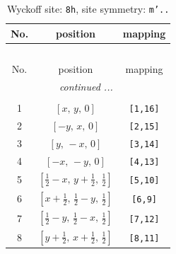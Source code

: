 \documentclass[fleqn,8pt]{jsarticle}
\begin{document}
\begin{longtable}{ccc}
\caption{Wyckoff site: {\tt 8h}, site symmetry: {\tt m'..}}
 \\
 \hline \hline
No. & position & mapping \\ \hline \endfirsthead

\multicolumn{2}{l}{\tablename\ \thetable{}} \\
 \hline \hline
No. & position & mapping \\ \hline \endhead

 \hline \hline
\multicolumn{2}{r}{\footnotesize\it continued ...} \\ \endfoot

 \hline \hline
\multicolumn{2}{r}{} \\ \endlastfoot

1 & $\left[ x,\, y,\, 0 \right]$ & {\tt [1,16]} \\ \hline
2 & $\left[ - y,\, x,\, 0 \right]$ & {\tt [2,15]} \\ \hline
3 & $\left[ y,\, - x,\, 0 \right]$ & {\tt [3,14]} \\ \hline
4 & $\left[ - x,\, - y,\, 0 \right]$ & {\tt [4,13]} \\ \hline
5 & $\left[ \frac{1}{2} - x,\, y + \frac{1}{2},\, \frac{1}{2} \right]$ & {\tt [5,10]} \\ \hline
6 & $\left[ x + \frac{1}{2},\, \frac{1}{2} - y,\, \frac{1}{2} \right]$ & {\tt [6,9]} \\ \hline
7 & $\left[ \frac{1}{2} - y,\, \frac{1}{2} - x,\, \frac{1}{2} \right]$ & {\tt [7,12]} \\ \hline
8 & $\left[ y + \frac{1}{2},\, x + \frac{1}{2},\, \frac{1}{2} \right]$ & {\tt [8,11]} \\
\end{longtable}
\renewcommand{\arraystretch}{1.2}
\end{document}
